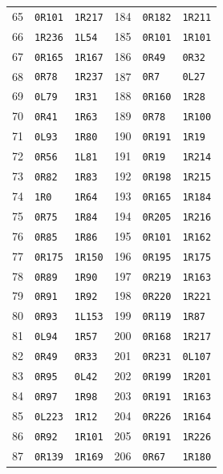\begin{longtable}{rll@{\qquad}rll}
65 & \texttt{0R101} & \texttt{1R217} & 184 & \texttt{0R182} & \texttt{1R211}\\
66 & \texttt{1R236} & \texttt{1L54} & 185 & \texttt{0R101} & \texttt{1R101}\\
67 & \texttt{0R165} & \texttt{1R167} & 186 & \texttt{0R49} & \texttt{0R32}\\
68 & \texttt{0R78} & \texttt{1R237} & 187 & \texttt{0R7} & \texttt{0L27}\\
69 & \texttt{0L79} & \texttt{1R31} & 188 & \texttt{0R160} & \texttt{1R28}\\
70 & \texttt{0R41} & \texttt{1R63} & 189 & \texttt{0R78} & \texttt{1R100}\\
71 & \texttt{0L93} & \texttt{1R80} & 190 & \texttt{0R191} & \texttt{1R19}\\
72 & \texttt{0R56} & \texttt{1L81} & 191 & \texttt{0R19} & \texttt{1R214}\\
73 & \texttt{0R82} & \texttt{1R83} & 192 & \texttt{0R198} & \texttt{1R215}\\
74 & \texttt{1R0} & \texttt{1R64} & 193 & \texttt{0R165} & \texttt{1R184}\\
75 & \texttt{0R75} & \texttt{1R84} & 194 & \texttt{0R205} & \texttt{1R216}\\
76 & \texttt{0R85} & \texttt{1R86} & 195 & \texttt{0R101} & \texttt{1R162}\\
77 & \texttt{0R175} & \texttt{1R150} & 196 & \texttt{0R195} & \texttt{1R175}\\
78 & \texttt{0R89} & \texttt{1R90} & 197 & \texttt{0R219} & \texttt{1R163}\\
79 & \texttt{0R91} & \texttt{1R92} & 198 & \texttt{0R220} & \texttt{1R221}\\
80 & \texttt{0R93} & \texttt{1L153} & 199 & \texttt{0R119} & \texttt{1R87}\\
81 & \texttt{0L94} & \texttt{1R57} & 200 & \texttt{0R168} & \texttt{1R217}\\
82 & \texttt{0R49} & \texttt{0R33} & 201 & \texttt{0R231} & \texttt{0L107}\\
83 & \texttt{0R95} & \texttt{0L42} & 202 & \texttt{0R199} & \texttt{1R201}\\
84 & \texttt{0R97} & \texttt{1R98} & 203 & \texttt{0R191} & \texttt{1R163}\\
85 & \texttt{0L223} & \texttt{1R12} & 204 & \texttt{0R226} & \texttt{1R164}\\
86 & \texttt{0R92} & \texttt{1R101} & 205 & \texttt{0R191} & \texttt{1R226}\\
87 & \texttt{0R139} & \texttt{1R169} & 206 & \texttt{0R67} & \texttt{1R180}\\

\end{longtable}

